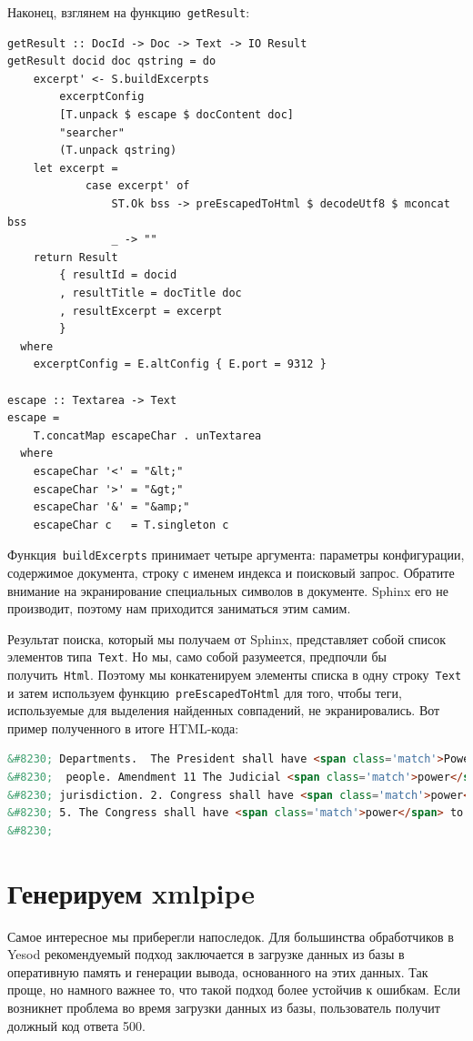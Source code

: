 Наконец, взглянем на функцию~\lstinline'getResult':
\begin{lstlisting}
getResult :: DocId -> Doc -> Text -> IO Result
getResult docid doc qstring = do
    excerpt' <- S.buildExcerpts
        excerptConfig
        [T.unpack $ escape $ docContent doc]
        "searcher"
        (T.unpack qstring)
    let excerpt =
            case excerpt' of
                ST.Ok bss -> preEscapedToHtml $ decodeUtf8 $ mconcat bss
                _ -> ""
    return Result
        { resultId = docid
        , resultTitle = docTitle doc
        , resultExcerpt = excerpt
        }
  where
    excerptConfig = E.altConfig { E.port = 9312 }

escape :: Textarea -> Text
escape =
    T.concatMap escapeChar . unTextarea
  where
    escapeChar '<' = "&lt;"
    escapeChar '>' = "&gt;"
    escapeChar '&' = "&amp;"
    escapeChar c   = T.singleton c
\end{lstlisting}

Функция~\lstinline'buildExcerpts' принимает четыре аргумента: параметры
конфигурации, содержимое документа, строку с именем индекса и поисковый запрос.
Обратите внимание на экранирование специальных символов в документе. Sphinx его
не производит, поэтому нам приходится заниматься этим самим.

Результат поиска, который мы получаем от Sphinx, представляет собой список
элементов типа~\lstinline'Text'. Но мы, само собой разумеется, предпочли бы
получить~\lstinline'Html'. Поэтому мы конкатенируем элементы списка в одну
строку~\lstinline'Text' и затем используем функцию~\lstinline'preEscapedToHtml'
для того, чтобы теги, используемые для выделения найденных совпадений, не
экранировались. Вот пример полученного в итоге HTML-кода:
\begin{lstlisting}[language=HTML]
&#8230; Departments.  The President shall have <span class='match'>Power</span> to fill up all Vacancies
&#8230;  people. Amendment 11 The Judicial <span class='match'>power</span> of the United States shall
&#8230; jurisdiction. 2. Congress shall have <span class='match'>power</span> to enforce this article by
&#8230; 5. The Congress shall have <span class='match'>power</span> to enforce, by appropriate legislation
&#8230;
\end{lstlisting}

\section{Генерируем xmlpipe}
Самое интересное мы приберегли напоследок. Для большинства обработчиков в Yesod
рекомендуемый подход заключается в загрузке данных из базы в оперативную память
и генерации вывода, основанного на этих данных. Так проще, но намного важнее
то, что такой подход более устойчив к ошибкам. Если возникнет проблема во время
загрузки данных из базы, пользователь получит должный код ответа 500.

